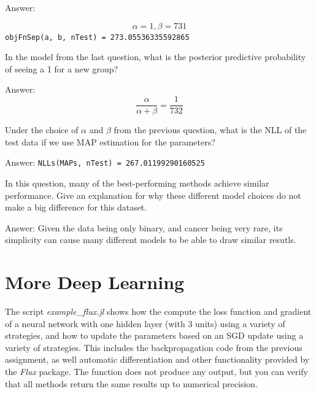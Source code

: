 \documentclass{article}
\def\ans#1{\par\gre{Answer: #1}}
\def\blu#1{{\color{blu}#1}}
\def\gre#1{{\color{gre}#1}}
\begin{document}
{\ans{

\[\alpha=1,\beta=731\]
\texttt{objFnSep(a, b, nTest) = 273.05536335592865}
}
\item In the model from the last question, \blu{what is the posterior predictive probability of seeing a 1 for a new group?}
\ans{
\[\frac{\alpha}{\alpha+\beta}=\frac{1}{732}\]
}
\item Under the choice of $\alpha$ and $\beta$ from the previous question, \blu{what is the NLL of the test data if we use MAP estimation for the parameters?}
\ans{
\texttt{NLLs(MAPs, nTest) = 267.01199290160525}
}
\item In this question, many of the best-performing methods achieve similar performance. \blu{Give an explanation for why these different model choices do not make a big difference for this dataset.}
\ans{
Given the data being only binary, and cancer being very rare, its simplicity can cause many different models to be able to draw similar resutls.
}
}
\pagebreak

\section{More Deep Learning}

The script \emph{example\_flux.jl} shows how the compute the loss function and gradient of a neural network with one hidden layer (with 3 units) using a variety of strategies, and how to update the parameters based on an SGD update using a variety of strategies. This includes the backpropagation code from the previous assignment, as well  automatic differentiation and other functionality provided by the \emph{Flux} package. The function does not produce any output, but you can verify that all methods return the same results up to numerical precision.
\end{document}
